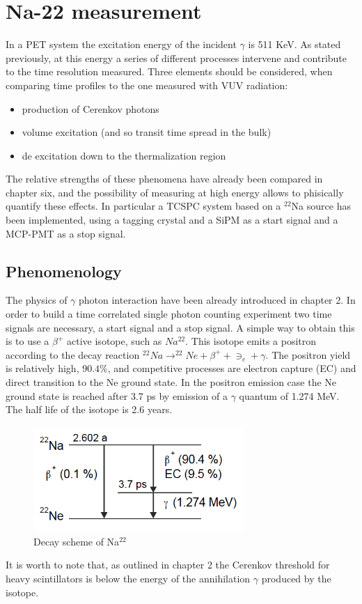 \chapter{Na-22 measurement}

In a PET system the excitation energy of the incident $\gamma$ is 511 KeV. As stated previously, at this energy a series of different processes intervene and contribute to the time resolution measured.
Three elements should be considered, when comparing time profiles to the one measured with VUV radiation:
\begin{itemize}
\item production of Cerenkov photons
\item volume excitation (and so transit time spread in the bulk)
\item de excitation down to the thermalization region
\end{itemize}
The relative strengths of these phenomena have already been compared in chapter six, and the possibility of measuring at high energy allows to phisically quantify these effects.
In particular a TCSPC system based on a $^{22}$Na source has been implemented, using a tagging crystal and a SiPM as a start signal and a MCP-PMT as a stop signal. 

\section{Phenomenology}

The physics of $\gamma$ photon interaction have been already introduced in chapter 2.
In order to build a time correlated single photon counting experiment two time signals are necessary, a start signal and a stop signal.
A simple way to obtain this is to use a $\beta ^{+}$ active isotope, such as $Na^{22}$. This isotope emits a positron according to the decay reaction $^{22}Na \rightarrow ^{22}Ne + \beta ^{+} + \ni _{e} + \gamma$. The positron yield is relatively high, $90.4\%$, and competitive processes are electron capture (EC) and direct transition to the Ne ground state. 
In the positron emission case the Ne ground state is reached after 3.7 ps by emission of a $\gamma$ quantum of 1.274 MeV. The half life of the isotope is 2.6 years.
\begin{figure}[htbp]
\begin{center}
\includegraphics[width=8cm]{../Pictures/Chapter_8/Na-22}
\end{center}
\caption[Na$^{22}$ decay scheme]{Decay scheme of Na$^{22}$}
\label{fig:Na_22}
\end{figure}
It is worth to note that, as outlined in chapter 2 the Cerenkov threshold for heavy scintillators is below the energy of the annihilation $\gamma$ produced by the isotope.


